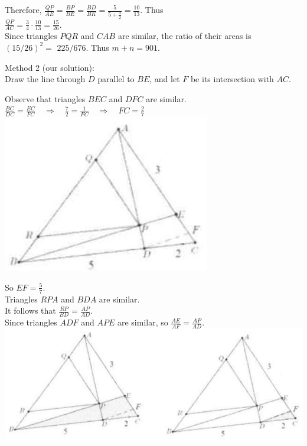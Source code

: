 \documentclass{article}
\begin{document}
Therefore, \(\frac{Q P}{A E}=\frac{B P}{B E}=\frac{B D}{B K}=\frac{5}{5+\frac{3}{2}}=\frac{10}{13}\). Thus\\
\(\frac{Q P}{A C}=\frac{3}{4} \cdot \frac{10}{13}=\frac{15}{26}\).\\
Since triangles \(P Q R\) and \(C A B\) are similar, the ratio of their areas is \((15 / 26)^{2}=\) \(225 / 676\). Thus \(m+n=901\).

Method 2 (our solution):\\
Draw the line through \(D\) parallel to \(B E\), and let \(F\) be its intersection with \(A C\).

Observe that triangles \(B E C\) and \(D F C\) are similar.\\
\(\frac{B C}{D C}=\frac{E C}{F C} \quad \Rightarrow \quad \frac{7}{2}=\frac{1}{F C} \quad \Rightarrow \quad F C=\frac{2}{7}\)\\
\centering
\includegraphics[width=\textwidth]{images/122(1).jpg}

So \(E F=\frac{5}{7}\).\\
Triangles \(R P A\) and \(B D A\) are similar.\\
It follows that \(\frac{R P}{B D}=\frac{A P}{A D}\).\\
Since triangles \(A D F\) and \(A P E\) are similar, so \(\frac{A E}{A F}=\frac{A P}{A D}\).\\
\centering
\includegraphics[width=\textwidth]{images/122(2).jpg}
\end{document}
